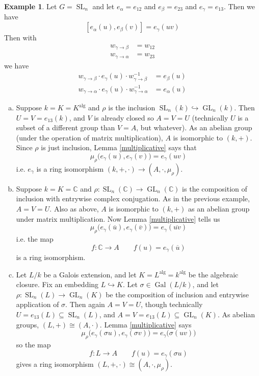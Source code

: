 \documentclass[12pt]{article}
\theoremstyle{definition}
\newtheorem{example}{Example}
\newcommand{\C}{\mathbb{C}}
\newcommand{\sig}{\sigma}
\newcommand{\inv}{^{-1}}
\newcommand{\ov}{\overline}
\newcommand{\into}{\hookrightarrow}
\newcommand{\iso}{\cong}
\DeclareMathOperator{\Gal}{Gal}
\DeclareMathOperator{\SL}{SL}
\DeclareMathOperator{\GL}{GL}
\DeclareMathOperator{\alg}{alg}
\begin{document}
\begin{example}
Let $G = \SL_n$ and let $e_\alpha = e_{12}$ and $e_\beta = e_{23}$ and $e_\gamma = e_{13}$. Then we have
\[
	[e_\alpha(u), e_\beta(v)] = e_\gamma(uv)
\]
Then with 
\begin{align*}
	w_{\gamma \to \beta} &= w_{12} \\
	w_{\gamma \to \alpha} &= w_{23}
\end{align*}
we have
\begin{align*}
	w_{\gamma \to \beta} \cdot e_\gamma(u) \cdot w_{\gamma \to \beta} \inv &= e_\beta(u) \\
	w_{\gamma \to \alpha} \cdot e_\gamma(u) \cdot w_{\gamma \to \alpha} \inv &= e_\alpha(u)
\end{align*}
\begin{enumerate}[(a)]
\item Suppose $k=K = K^{\alg}$ and $\rho$ is the inclusion $\SL_n(k) \into \GL_n(k)$. Then $U = V = e_{13}(k)$, and $V$ is already closed so $A = V = U$ (technically $U$ is a subset of a different group than $V = A$, but whatever). As an abelian group (under the operation of matrix multiplication), $A$ is isomorphic to $(k, +)$. Since $\rho$ is just inclusion, Lemma \ref{multiplicative} says that
\[
	\mu_\rho \Big( e_\gamma(u), e_\gamma(v) \Big) = e_\gamma(uv)
\]
i.e. $e_\gamma$ is a ring isomorphism $(k, +, \cdot) \to (A, \cdot, \mu_\rho)$.

\item Suppose $k = K = \C$ and $\rho:\SL_n(\C) \to \GL_n(\C)$ is the composition of inclusion with entrywise complex conjugation. As in the previous example, $A = V = U$. Also as above, $A$ is isomorphic to $(k,+)$ as an abelian group under matrix multiplication. Now Lemma \ref{multiplicative} tells us
\[
	\mu_\rho \Big(  e_\gamma( \ov u), e_\gamma( \ov v) \Big) = e_\gamma(\ov{uv})
\]
i.e. the map
\[
	f:\C \to A \qquad f(u) = e_\gamma( \ov u)
\]
is a ring isomorphism.

\item Let $L/k$ be a Galois extension, and let $K = L^{\alg} = k^{\alg}$ be the algebraic closure. Fix an embedding $L \into K$. Let $\sig \in \Gal(L/k)$, and let $\rho:\SL_n(L) \to \GL_n(K)$ be the composition of inclusion and entrywise application of $\sig$. Then again $A = V = U$, though technically $U = e_{13}(L) \subseteq \SL_n(L)$, and $A = V = e_{13}(L) \subseteq \GL_n(K)$. As abelian groups, $(L, +) \iso (A, \cdot)$. Lemma \ref{multiplicative} says
\[
	\mu_\rho \Big( e_\gamma( \sig u), e_\gamma ( \sig v) \Big) = e_\gamma \Big( \sig(uv) \Big)
\]
so the map
\[
	f:L \to A \qquad f(u) = e_\gamma( \sig u)
\]
gives a ring isomorphism $(L, +, \cdot) \iso (A, \cdot, \mu_\rho)$.

\end{enumerate}
\end{example}
\end{document}
